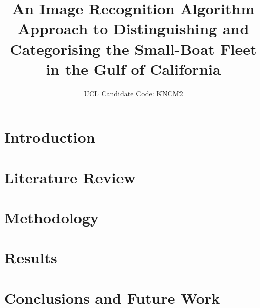 \documentclass[12pt]{report}
\begin{document}
\vspace*{-5cm}
\hspace*{-1.35cm}
\vfill %

\title{An Image Recognition Algorithm Approach to Distinguishing and Categorising the Small-Boat Fleet in the Gulf of California}
\author{UCL Candidate Code: KNCM2}

\beforepreface


\afterpreface
\hypersetup{linkcolor=magenta}


\chapter{Introduction}
\label{chapter:Introduction}



\chapter{Literature Review}
\label{chapter:Review}


\chapter{Methodology}
\label{chapter:Methodology}


\chapter{Results}
\label{chapter:Results}


\chapter{Conclusions and Future Work}
\label{chapter:Conclusions_and_Future_Work}




\end{document}
